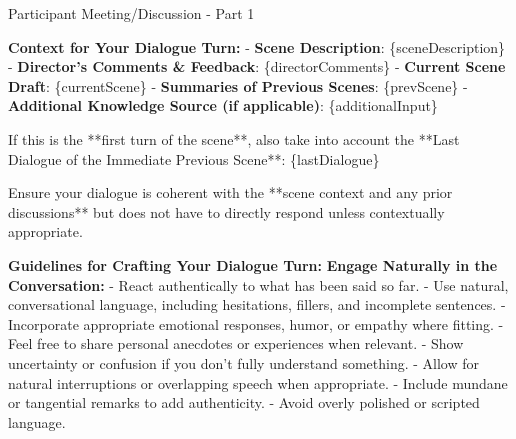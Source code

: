 \begin{figure*}[t]
\begin{AIbox}{Participant Meeting/Discussion - Part 1}
{        \textbf{Context for Your Dialogue Turn:}\newline
        - \textbf{Scene Description}: \{sceneDescription\}\newline
        - \textbf{Director's Comments \& Feedback}: \{directorComments\}\newline
        - \textbf{Current Scene Draft}: \{currentScene\}\newline
        - \textbf{Summaries of Previous Scenes}: \{prevScene\}\newline
        - \textbf{Additional Knowledge Source (if applicable)}: \{additionalInput\}\newline

        If this is the **first turn of the scene**, also take into account the **Last Dialogue of the Immediate Previous Scene**:
        \{lastDialogue\}\newline

        Ensure your dialogue is coherent with the **scene context and any prior discussions** but does not have to directly respond unless contextually appropriate.\newline

        \textbf{Guidelines for Crafting Your Dialogue Turn:}\newline
        \textbf{Engage Naturally in the Conversation:}\newline
        - React authentically to what has been said so far.\newline
        - Use natural, conversational language, including hesitations, fillers, and incomplete sentences.\newline
        - Incorporate appropriate emotional responses, humor, or empathy where fitting.\newline
        - Feel free to share personal anecdotes or experiences when relevant.\newline
        - Show uncertainty or confusion if you don't fully understand something.\newline
        - Allow for natural interruptions or overlapping speech when appropriate.\newline
        - Include mundane or tangential remarks to add authenticity.\newline
        - Avoid overly polished or scripted language.\newline
    }
    \end{AIbox}
    \caption{Participant Meeting/Discussion - Part 1}
    \label{fig:participant_meeting_discussion_1}
\end{figure*}

